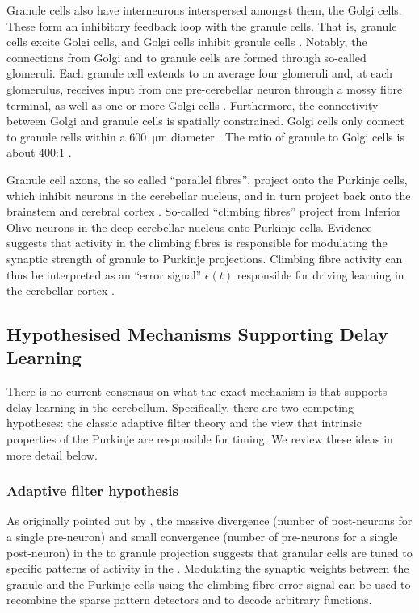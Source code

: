 Granule cells also have interneurons interspersed amongst them, the Golgi cells.
These form an inhibitory feedback loop with the granule cells.
That is, granule cells excite Golgi cells, and Golgi cells inhibit granule cells \citep{ito2010cerebellar}.
Notably, the connections from Golgi and \PCN to granule cells are formed through so-called glomeruli.
Each granule cell extends to on average four glomeruli and, at each glomerulus, receives input from one pre-cerebellar neuron through a mossy fibre terminal, as well as one or more Golgi cells \citep{palkovits1972quantitative,jakab1988quantitative,chadderton2004integration}.
Furthermore, the connectivity between Golgi and granule cells is spatially constrained.
Golgi cells only connect to granule cells within a \SI{600}{\micro\metre} diameter \citep{albus1971theory,dangelo2013cerebellar}.
The ratio of granule to Golgi cells is about $400$:$1$ \citep{korbo1993total}.

Granule cell axons, the so called \enquote{parallel fibres}, project onto the Purkinje cells, which inhibit neurons in the cerebellar nucleus, and in turn project back onto the brainstem and cerebral cortex \citep{ito2010cerebellar,llinas2010olivocerebellar}.
So-called \enquote{climbing fibres} project from Inferior Olive neurons in the deep cerebellar nucleus onto Purkinje cells. 
Evidence suggests that activity in the climbing fibres is responsible for modulating the synaptic strength of granule to Purkinje projections.
Climbing fibre activity can thus be interpreted as an \enquote{error signal} $\epsilon(t)$ responsible for driving learning in the cerebellar cortex \citep{ito2010cerebellar}.

\subsection{Hypothesised Mechanisms Supporting Delay Learning}

There is no current consensus on what the exact mechanism is that supports delay learning in the cerebellum.
Specifically, there are two competing hypotheses: the classic adaptive filter theory and the view that intrinsic properties of the Purkinje are responsible for timing.
We review these ideas in more detail below.

\subsubsection{Adaptive filter hypothesis}
As originally pointed out by \citet{marr1969theory,albus1971theory}, the massive divergence (number of post-neurons for a single pre-neuron) and small convergence (number of pre-neurons for a single post-neuron) in the \PCN to granule projection suggests that granular cells are tuned to specific patterns of activity in the \PCN.
Modulating the synaptic weights between the granule and the Purkinje cells using the climbing fibre error signal can be used to recombine the sparse pattern detectors and to decode arbitrary functions.

